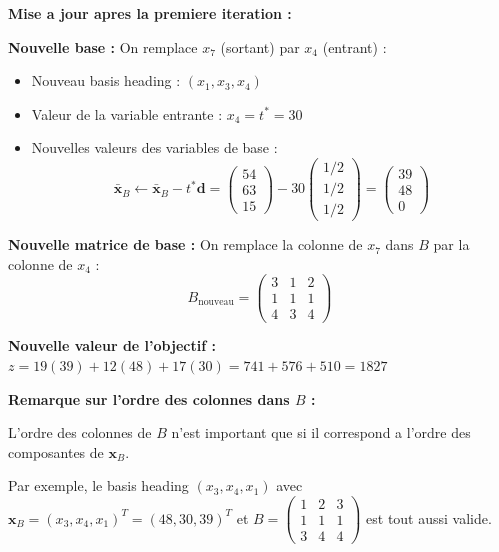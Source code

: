 \documentclass[12pt,a4paper]{article}
\begin{document}
\begin{methode}
\textbf{Mise a jour apres la premiere iteration :}

\textbf{Nouvelle base :} On remplace $x_7$ (sortant) par $x_4$ (entrant) :
\begin{itemize}
    \item Nouveau basis heading : $(x_1, x_3, x_4)$
    \item Valeur de la variable entrante : $x_4 = t^* = 30$
    \item Nouvelles valeurs des variables de base :
    $$\bar{\mathbf{x}}_B \leftarrow \bar{\mathbf{x}}_B - t^* \mathbf{d} = \begin{pmatrix} 54 \\ 63 \\ 15 \end{pmatrix} - 30 \begin{pmatrix} 1/2 \\ 1/2 \\ 1/2 \end{pmatrix} = \begin{pmatrix} 39 \\ 48 \\ 0 \end{pmatrix}$$
\end{itemize}

\textbf{Nouvelle matrice de base :} On remplace la colonne de $x_7$ dans $B$ par la colonne de $x_4$ :
$$B_{\text{nouveau}} = \begin{pmatrix} 3 & 1 & 2 \\ 1 & 1 & 1 \\ 4 & 3 & 4 \end{pmatrix}$$

\textbf{Nouvelle valeur de l'objectif :} $z = 19(39) + 12(48) + 17(30) = 741 + 576 + 510 = 1827$
\end{methode}

\begin{astuce}
\textbf{Remarque sur l'ordre des colonnes dans $B$ :}

L'ordre des colonnes de $B$ n'est important que si il correspond a l'ordre des composantes de $\mathbf{x}_B$.

Par exemple, le basis heading $(x_3, x_4, x_1)$ avec $\mathbf{x}_B = (x_3, x_4, x_1)^T = (48, 30, 39)^T$ et $B = \begin{pmatrix} 1 & 2 & 3 \\ 1 & 1 & 1 \\ 3 & 4 & 4 \end{pmatrix}$ est tout aussi valide.
\end{astuce}
\end{document}
